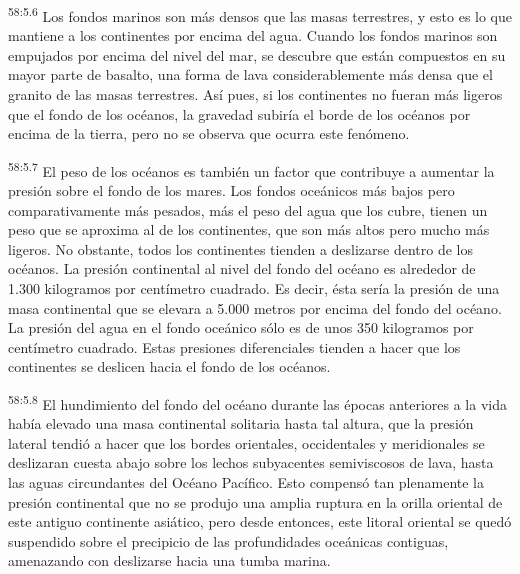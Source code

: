 \par
\textsuperscript{58:5.6} Los fondos marinos son más densos que las masas terrestres, y esto es lo que mantiene a los continentes por encima del agua. Cuando los fondos marinos son empujados por encima del nivel del mar, se descubre que están compuestos en su mayor parte de basalto, una forma de lava considerablemente más densa que el granito de las masas terrestres. Así pues, si los continentes no fueran más ligeros que el fondo de los océanos, la gravedad subiría el borde de los océanos por encima de la tierra, pero no se observa que ocurra este fenómeno.

\par
\textsuperscript{58:5.7} El peso de los océanos es también un factor que contribuye a aumentar la presión sobre el fondo de los mares. Los fondos oceánicos más bajos pero comparativamente más pesados, más el peso del agua que los cubre, tienen un peso que se aproxima al de los continentes, que son más altos pero mucho más ligeros. No obstante, todos los continentes tienden a deslizarse dentro de los océanos. La presión continental al nivel del fondo del océano es alrededor de 1.300 kilogramos por centímetro cuadrado. Es decir, ésta sería la presión de una masa continental que se elevara a 5.000 metros por encima del fondo del océano. La presión del agua en el fondo oceánico sólo es de unos 350 kilogramos por centímetro cuadrado. Estas presiones diferenciales tienden a hacer que los continentes se deslicen hacia el fondo de los océanos.

\par
\textsuperscript{58:5.8} El hundimiento del fondo del océano durante las épocas anteriores a la vida había elevado una masa continental solitaria hasta tal altura, que la presión lateral tendió a hacer que los bordes orientales, occidentales y meridionales se deslizaran cuesta abajo sobre los lechos subyacentes semiviscosos de lava, hasta las aguas circundantes del Océano Pacífico. Esto compensó tan plenamente la presión continental que no se produjo una amplia ruptura en la orilla oriental de este antiguo continente asiático, pero desde entonces, este litoral oriental se quedó suspendido sobre el precipicio de las profundidades oceánicas contiguas, amenazando con deslizarse hacia una tumba marina.

